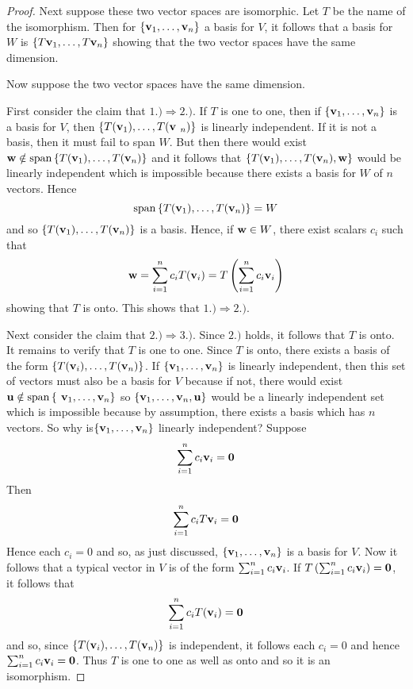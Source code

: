 \begin{proof}
Next suppose these two vector spaces are isomorphic. Let $T$ be the name of
the isomorphism. Then for $\left\{\mbox{\bf v}_{1},\ldots,\mbox{\bf v}_{n}\right\} $
a basis for $V$, it follows that a basis for $W$
is $\left\{T\mbox{\bf v}_{1},\ldots,T\mbox{\bf v}_{n}\right\} $ showing that the two
vector spaces have the same dimension.

Now suppose the two vector spaces have the same dimension.

First consider the claim that $1.)\Rightarrow 2.)$. If $T$ is one to one,
then if $\left\{\mbox{\bf v}_{1},\ldots,\mbox{\bf v}
_{n}\right\} $ is a basis for $V$, then $\set{T(\vect{v}_{1}),\ldots,T(\vect{v
}_{n})} $ is linearly independent. If it is not a basis, then it must
fail to span $W$. But then there would exist $\vect{w}\notin \sspan
\set{T(\vect{v}_{1}),\ldots,T(\vect{v}_{n})} $ and it follows that $
\left\{T(\mbox{\bf v}_{1}),\ldots,T(\mbox{\bf v}_{n}),\mbox{\bf w}\right\} $ would be
linearly independent which is impossible because there exists a basis for $W$
of $n$ vectors. Hence
\[
\sspan\set{T(\vect{v}_{1}),\ldots,T(\vect{v}
_{n})} =W
\]
and so $\set{T(\vect{v}_{1}),\ldots,T(\vect{v}_{n})} $
is a basis. Hence, if $\mbox{\bf w}\in W$, there exist scalars $c_{i}$ such that
\begin{equation*}
\mbox{\bf w}=\sum_{i=1}^{n}c_{i}T(\mbox{\bf v}_{i})=T\left(\sum_{i=1}^{n}c_{i}\mbox{\bf v}
_{i}\right)
\end{equation*}
showing that $T$ is onto. This shows that $1.)\Rightarrow 2.)$.

Next consider the claim that $2.)\Rightarrow 3.)$. Since $2.)$ holds, it
follows that $T$ is onto. It remains to verify that $T$ is one to one. Since
$T$ is onto, there exists a basis of the form $\left\{T(\mbox{\bf v}_{i}),\ldots,T
(\mbox{\bf v}_{n})\right\}$. If $\left\{\mbox{\bf v}_{1},\ldots,\mbox{\bf v}_{n}\right\} $
is linearly independent, then this set of vectors must also be a basis for $
V $ because if not, there would exist $\vect{u}\notin \sspan\set{\vect{
v}_{1},\ldots,\vect{v}_{n}} $ so $\left\{\mbox{\bf v}_{1},\ldots,\mbox{\bf v}
_{n},\mbox{\bf u}\right\} $ would be a linearly independent set which is
impossible because by assumption, there exists a basis which has $n$
vectors. So why is$\left\{\mbox{\bf v}_{1},\ldots,\mbox{\bf v}_{n}\right\} $
linearly independent? Suppose
\begin{equation*}
\sum_{i=1}^{n}c_{i}\mbox{\bf v}_{i}=\mbox{\bf 0}
\end{equation*}
Then
\begin{equation*}
\sum_{i=1}^{n}c_{i}T\mbox{\bf v}_{i}=\mbox{\bf 0}
\end{equation*}
Hence each $c_{i}=0$ and so, as just discussed, $\left\{\mbox{\bf v}_{1},\ldots,
\mbox{\bf v}_{n}\right\} $ is a basis for $V$. Now it follows that a typical
vector in $V$ is of the form $\sum_{i=1}^{n}c_{i}\mbox{\bf v}_{i}$. If $T\left(
\sum_{i=1}^{n}c_{i}\mbox{\bf v}_{i}\right) =\mbox{\bf 0}$, it follows that
\begin{equation*}
\sum_{i=1}^{n}c_{i}T(\mbox{\bf v}_{i})=\mbox{\bf 0}
\end{equation*}
and so, since $\left\{T(\mbox{\bf v}_{i}),\ldots,T(\mbox{\bf v}_{n})\right\} $ is
independent, it follows each $c_{i}=0$ and hence $\sum_{i=1}^{n}c_{i}\mbox{\bf v}
_{i}=\mbox{\bf 0}$. Thus $T$ is one to one as well as onto and so it is an
isomorphism.


\end{proof}
